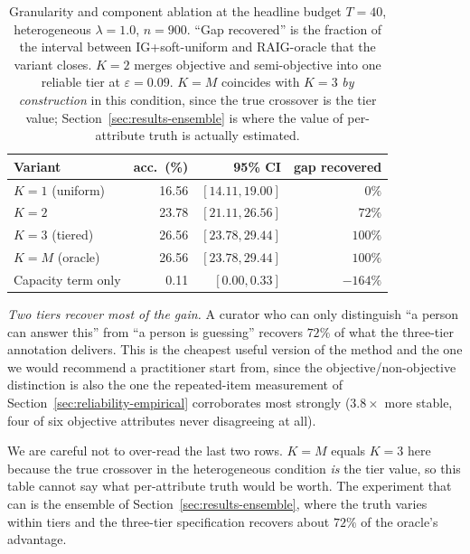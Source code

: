\begin{table}[t]
\caption{Granularity and component ablation at the headline budget $T=40$,
heterogeneous $\lambda = 1.0$, $n = 900$. ``Gap recovered'' is the fraction of
the interval between IG+soft-uniform and RAIG-oracle that the variant closes.
$K=2$ merges objective and semi-objective into one reliable tier at
$\varepsilon = 0.09$. $K=M$ coincides with $K=3$ \emph{by construction} in this
condition, since the true crossover is the tier value;
Section~\ref{sec:results-ensemble} is where the value of per-attribute truth is
actually estimated.}
\label{tab:ablation}
\centering
\footnotesize
\begin{tabular}{@{}lrrr@{}}
\toprule
\textbf{Variant} & \textbf{acc.\ (\%)} & \textbf{95\% CI} &
\textbf{gap recovered} \\
\midrule
$K=1$ (uniform)     & 16.56 & $[14.11, 19.00]$ & $0\%$ \\
$K=2$               & 23.78 & $[21.11, 26.56]$ & $72\%$ \\
$K=3$ (tiered)      & 26.56 & $[23.78, 29.44]$ & $100\%$ \\
$K=M$ (oracle)      & 26.56 & $[23.78, 29.44]$ & $100\%$ \\
Capacity term only  & 0.11  & $[0.00, 0.33]$   & $-164\%$ \\
\bottomrule
\end{tabular}
\end{table}

\emph{Two tiers recover most of the gain.} A curator who can only distinguish
``a person can answer this'' from ``a person is guessing'' recovers $72\%$ of
what the three-tier annotation delivers. This is the cheapest useful version of
the method and the one we would recommend a practitioner start from, since the
objective/non-objective distinction is also the one the repeated-item
measurement of Section~\ref{sec:reliability-empirical} corroborates most
strongly ($3.8\times$ more stable, four of six objective attributes never
disagreeing at all).

We are careful not to over-read the last two rows. $K=M$ equals $K=3$ here
because the true crossover in the heterogeneous condition \emph{is} the tier
value, so this table cannot say what per-attribute truth would be worth. The
experiment that can is the ensemble of Section~\ref{sec:results-ensemble},
where the truth varies within tiers and the three-tier specification recovers
about $72\%$ of the oracle's advantage.

